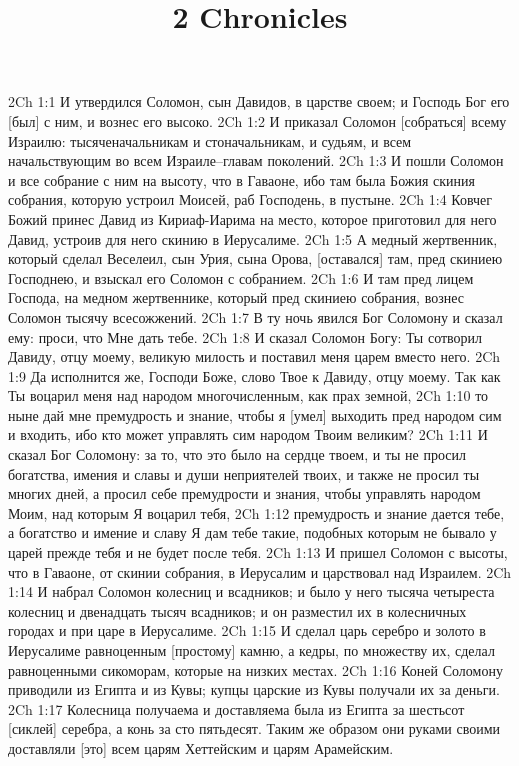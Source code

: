 

\title{2 Chronicles}

2Ch 1:1  И утвердился Соломон, сын Давидов, в царстве своем; и Господь Бог его [был] с ним, и вознес его высоко.
2Ch 1:2  И приказал Соломон [собраться] всему Израилю: тысяченачальникам и стоначальникам, и судьям, и всем начальствующим во всем Израиле--главам поколений.
2Ch 1:3  И пошли Соломон и все собрание с ним на высоту, что в Гаваоне, ибо там была Божия скиния собрания, которую устроил Моисей, раб Господень, в пустыне.
2Ch 1:4  Ковчег Божий принес Давид из Кириаф-Иарима на место, которое приготовил для него Давид, устроив для него скинию в Иерусалиме.
2Ch 1:5  А медный жертвенник, который сделал Веселеил, сын Урия, сына Орова, [оставался] там, пред скиниею Господнею, и взыскал его Соломон с собранием.
2Ch 1:6  И там пред лицем Господа, на медном жертвеннике, который пред скиниею собрания, вознес Соломон тысячу всесожжений.
2Ch 1:7  В ту ночь явился Бог Соломону и сказал ему: проси, что Мне дать тебе.
2Ch 1:8  И сказал Соломон Богу: Ты сотворил Давиду, отцу моему, великую милость и поставил меня царем вместо него.
2Ch 1:9  Да исполнится же, Господи Боже, слово Твое к Давиду, отцу моему. Так как Ты воцарил меня над народом многочисленным, как прах земной,
2Ch 1:10  то ныне дай мне премудрость и знание, чтобы я [умел] выходить пред народом сим и входить, ибо кто может управлять сим народом Твоим великим?
2Ch 1:11  И сказал Бог Соломону: за то, что это было на сердце твоем, и ты не просил богатства, имения и славы и души неприятелей твоих, и также не просил ты многих дней, а просил себе премудрости и знания, чтобы управлять народом Моим, над которым Я воцарил тебя,
2Ch 1:12  премудрость и знание дается тебе, а богатство и имение и славу Я дам тебе такие, подобных которым не бывало у царей прежде тебя и не будет после тебя.
2Ch 1:13  И пришел Соломон с высоты, что в Гаваоне, от скинии собрания, в Иерусалим и царствовал над Израилем.
2Ch 1:14  И набрал Соломон колесниц и всадников; и было у него тысяча четыреста колесниц и двенадцать тысяч всадников; и он разместил их в колесничных городах и при царе в Иерусалиме.
2Ch 1:15  И сделал царь серебро и золото в Иерусалиме равноценным [простому] камню, а кедры, по множеству их, сделал равноценными сикоморам, которые на низких местах.
2Ch 1:16  Коней Соломону приводили из Египта и из Кувы; купцы царские из Кувы получали их за деньги.
2Ch 1:17  Колесница получаема и доставляема была из Египта за шестьсот [сиклей] серебра, а конь за сто пятьдесят. Таким же образом они руками своими доставляли [это] всем царям Хеттейским и царям Арамейским.
